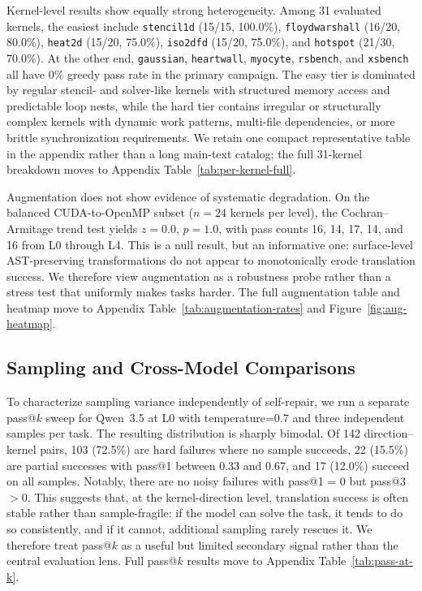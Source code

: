 Kernel-level results show equally strong heterogeneity. Among 31 evaluated kernels, the easiest include \texttt{stencil1d} (15/15, 100.0\%), \texttt{floydwarshall} (16/20, 80.0\%), \texttt{heat2d} (15/20, 75.0\%), \texttt{iso2dfd} (15/20, 75.0\%), and \texttt{hotspot} (21/30, 70.0\%). At the other end, \texttt{gaussian}, \texttt{heartwall}, \texttt{myocyte}, \texttt{rsbench}, and \texttt{xsbench} all have 0\% greedy pass rate in the primary campaign. The easy tier is dominated by regular stencil- and solver-like kernels with structured memory access and predictable loop nests, while the hard tier contains irregular or structurally complex kernels with dynamic work patterns, multi-file dependencies, or more brittle synchronization requirements. We retain one compact representative table in the appendix rather than a long main-text catalog; the full 31-kernel breakdown moves to Appendix Table~\ref{tab:per-kernel-full}.

Augmentation does not show evidence of systematic degradation. On the balanced CUDA-to-OpenMP subset ($n=24$ kernels per level), the Cochran--Armitage trend test yields $z = 0.0$, $p = 1.0$, with pass counts 16, 14, 17, 14, and 16 from L0 through L4. This is a null result, but an informative one: surface-level AST-preserving transformations do not appear to monotonically erode translation success. We therefore view augmentation as a robustness probe rather than a stress test that uniformly makes tasks harder. The full augmentation table and heatmap move to Appendix Table~\ref{tab:augmentation-rates} and Figure~\ref{fig:aug-heatmap}.

\subsection{Sampling and Cross-Model Comparisons}
\label{sec:cross-model}

To characterize sampling variance independently of self-repair, we run a separate pass@$k$ sweep for Qwen~3.5 at L0 with temperature=0.7 and three independent samples per task. The resulting distribution is sharply bimodal. Of 142 direction--kernel pairs, 103 (72.5\%) are hard failures where no sample succeeds, 22 (15.5\%) are partial successes with pass@1 between 0.33 and 0.67, and 17 (12.0\%) succeed on all samples. Notably, there are no noisy failures with pass@1 = 0 but pass@3 $> 0$. This suggests that, at the kernel-direction level, translation success is often stable rather than sample-fragile: if the model can solve the task, it tends to do so consistently, and if it cannot, additional sampling rarely rescues it. We therefore treat pass@$k$ as a useful but limited secondary signal rather than the central evaluation lens. Full pass@$k$ results move to Appendix Table~\ref{tab:pass-at-k}.

